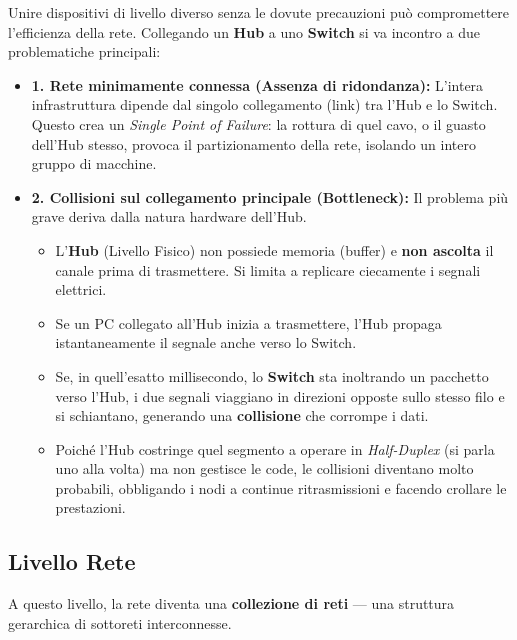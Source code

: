 \documentclass[a4paper,12pt]{report}
\begin{document}
\begin{notebox}{}
Unire dispositivi di livello diverso senza le dovute precauzioni può compromettere l'efficienza della rete. Collegando un \textbf{Hub} a uno \textbf{Switch} si va incontro a due problematiche principali:

\begin{itemize}[leftmargin=*]
    \item \textbf{1. Rete minimamente connessa (Assenza di ridondanza):}
    L'intera infrastruttura dipende dal singolo collegamento (link) tra l'Hub e lo Switch. Questo crea un \textit{Single Point of Failure}: la rottura di quel cavo, o il guasto dell'Hub stesso, provoca il partizionamento della rete, isolando un intero gruppo di macchine.

    \item \textbf{2. Collisioni sul collegamento principale (Bottleneck):}
    Il problema più grave deriva dalla natura hardware dell'Hub.
    \begin{itemize}
        \item L'\textbf{Hub} (Livello Fisico) non possiede memoria (buffer) e \textbf{non ascolta} il canale prima di trasmettere. Si limita a replicare ciecamente i segnali elettrici.
        \item Se un PC collegato all'Hub inizia a trasmettere, l'Hub propaga istantaneamente il segnale anche verso lo Switch.
        \item Se, in quell'esatto millisecondo, lo \textbf{Switch} sta inoltrando un pacchetto verso l'Hub, i due segnali viaggiano in direzioni opposte sullo stesso filo e si schiantano, generando una \textbf{collisione} che corrompe i dati.
        \item Poiché l'Hub costringe quel segmento a operare in \textit{Half-Duplex} (si parla uno alla volta) ma non gestisce le code, le collisioni diventano molto probabili, obbligando i nodi a continue ritrasmissioni e facendo crollare le prestazioni.
    \end{itemize}
\end{itemize}
\end{notebox}

\newpage
\subsection{Livello Rete}
A questo livello, la rete diventa una \textbf{collezione di reti} — una struttura gerarchica di sottoreti interconnesse.
\vspace{0.5cm}
\end{document}
